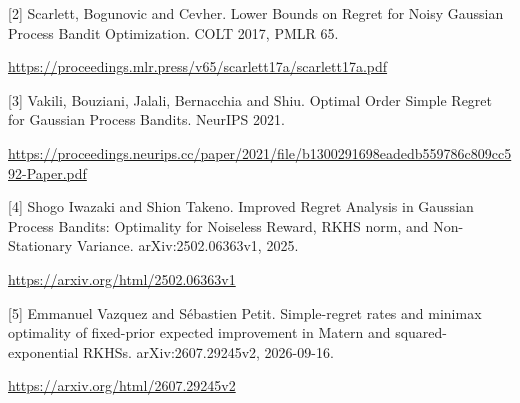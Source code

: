 \documentclass[10pt,a4paper]{article}
\begin{document}
[2] Scarlett, Bogunovic and Cevher. Lower Bounds on Regret for Noisy Gaussian Process Bandit Optimization. COLT 2017, PMLR 65.

\url{https://proceedings.mlr.press/v65/scarlett17a/scarlett17a.pdf}

[3] Vakili, Bouziani, Jalali, Bernacchia and Shiu. Optimal Order Simple Regret for Gaussian Process Bandits. NeurIPS 2021.

\url{https://proceedings.neurips.cc/paper/2021/file/b1300291698eadedb559786c809cc592-Paper.pdf}

[4] Shogo Iwazaki and Shion Takeno. Improved Regret Analysis in Gaussian Process Bandits: Optimality for Noiseless Reward, RKHS norm, and Non-Stationary Variance. arXiv:2502.06363v1, 2025.

\url{https://arxiv.org/html/2502.06363v1}

[5] Emmanuel Vazquez and Sébastien Petit. Simple-regret rates and minimax optimality of fixed-prior expected improvement in Matern and squared-exponential RKHSs. arXiv:2607.29245v2, 2026-09-16.

\url{https://arxiv.org/html/2607.29245v2}
\end{document}
